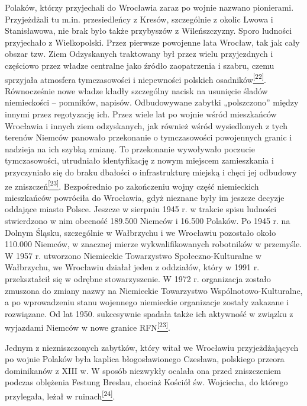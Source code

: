 \documentclass{article}
\begin{document}
Polaków, którzy przyjechali do Wrocławia zaraz po wojnie nazwano pionierami. Przyjeżdżali tu m.in. przesiedleńcy z Kresów, szczególnie z okolic Lwowa i Stanisławowa, nie brak było także przybyszów z Wileńszczyzny. Sporo ludności przyjechało z Wielkopolski. Przez pierwsze powojenne lata Wrocław, tak jak cały obszar tzw. Ziem Odzyskanych traktowany był przez wielu przyjezdnych i częściowo przez władze centralne jako źródło zaopatrzenia i szabru, czemu sprzyjała atmosfera tymczasowości i niepewności polskich osadników\hyperlink{22}{\textsuperscript{[22]}}. Równocześnie nowe władze kładły szczególny nacisk na usunięcie śladów niemieckości – pomników, napisów. Odbudowywane zabytki „polszczono” między innymi przez regotyzację ich.
Przez wiele lat po wojnie wśród mieszkańców Wrocławia i innych ziem odzyskanych, jak również wśród wysiedlonych z tych terenów Niemców panowało przekonanie o tymczasowości powojennych granic i nadzieja na ich szybką zmianę. To przekonanie wywoływało poczucie tymczasowości, utrudniało identyfikację z nowym miejscem zamieszkania i przyczyniało się do braku dbałości o infrastrukturę miejską i chęci jej odbudowy ze zniszczeń\hyperlink{23}{\textsuperscript{[23]}}.
Bezpośrednio po zakończeniu wojny część niemieckich mieszkańców powróciła do Wrocławia, gdyż nieznane były im jeszcze decyzje oddające miasto Polsce. Jeszcze w sierpniu 1945 r. w trakcie spisu ludności stwierdzono w nim obecność 189.500 Niemców i 16.500 Polaków. Po 1945 r. na Dolnym Śląsku, szczególnie w Wałbrzychu i we Wrocławiu pozostało około 110.000 Niemców, w znacznej mierze wykwalifikowanych robotników w przemyśle. W 1957 r. utworzono Niemieckie Towarzystwo Społeczno-Kulturalne w Wałbrzychu, we Wrocławiu działał jeden z oddziałów, który w 1991 r. przekształcił się w odrębne stowarzyszenie. W 1972 r. organizacja zostało zmuszona do zmiany nazwy na Niemieckie Towarzystwo Wspólnotowo-Kulturalne, a po wprowadzeniu stanu wojennego niemieckie organizacje zostały zakazane i rozwiązane. Od lat 1950. sukcesywnie spadała także ich aktywność w związku z wyjazdami Niemców w nowe granice RFN\hyperlink{23}{\textsuperscript{[23]}}.



Jednym z niezniszczonych zabytków, który witał we Wrocławiu przyjeżdżających po wojnie Polaków była kaplica błogosławionego Czesława, polskiego przeora dominikanów z XIII w. W sposób niezwykły ocalała ona przed zniszczeniem podczas oblężenia Festung Breslau, chociaż Kościół św. Wojciecha, do którego przylegała, leżał w ruinach\hyperlink{24}{\textsuperscript{[24]}}.
\end{document}
